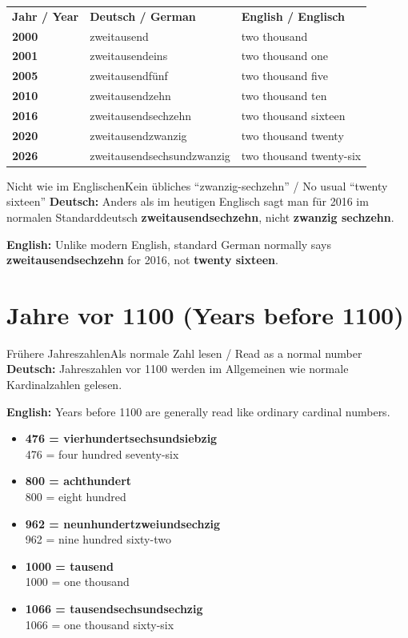\documentclass[a4paper,11pt]{article}
\newcommand{\GermanText}[1]{\textbf{Deutsch: }#1\par}
\newcommand{\EnglishText}[1]{{\small\color{SoftGray}\textbf{English: }#1\par}}
\newcommand{\ExampleItem}[2]{\item \textbf{#1}\\{\small\color{SoftGray}#2}}
\begin{document}
\begin{longtable}{>{\bfseries}p{2.2cm}|p{6.0cm}|p{6.0cm}}
\rowcolor{HeaderBlueDark}
\color{white}\textbf{Jahr / Year} &
\color{white}\textbf{Deutsch / German} &
\color{white}\textbf{English / Englisch} \\
2000 & zweitausend & two thousand \\
2001 & zweitausendeins & two thousand one \\
2005 & zweitausendfünf & two thousand five \\
2010 & zweitausendzehn & two thousand ten \\
2016 & zweitausendsechzehn & two thousand sixteen \\
2020 & zweitausendzwanzig & two thousand twenty \\
2026 & zweitausendsechsundzwanzig & two thousand twenty-six \\
\end{longtable}

\begin{grammarentry}{Nicht wie im Englischen}{Kein übliches ``zwanzig-sechzehn'' / No usual ``twenty sixteen''}
\GermanText{Anders als im heutigen Englisch sagt man für 2016 im normalen Standarddeutsch \textbf{zweitausendsechzehn}, nicht \textbf{zwanzig sechzehn}.}
\EnglishText{Unlike modern English, standard German normally says \textbf{zweitausendsechzehn} for 2016, not \textbf{twenty sixteen}.}
\end{grammarentry}

\section{Jahre vor 1100 \textnormal{(Years before 1100)}}

\begin{grammarentry}{Frühere Jahreszahlen}{Als normale Zahl lesen / Read as a normal number}
\GermanText{Jahreszahlen vor 1100 werden im Allgemeinen wie normale Kardinalzahlen gelesen.}
\EnglishText{Years before 1100 are generally read like ordinary cardinal numbers.}
\end{grammarentry}

\begin{exbox}
\begin{itemize}
\ExampleItem{476 = vierhundertsechsundsiebzig}{476 = four hundred seventy-six}
\ExampleItem{800 = achthundert}{800 = eight hundred}
\ExampleItem{962 = neunhundertzweiundsechzig}{962 = nine hundred sixty-two}
\ExampleItem{1000 = tausend}{1000 = one thousand}
\ExampleItem{1066 = tausendsechsundsechzig}{1066 = one thousand sixty-six}
\end{itemize}
\end{exbox}
\end{document}
